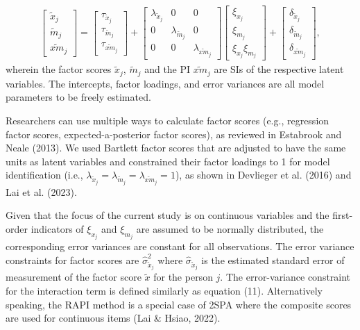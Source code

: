 \documentclass[
  man]{apa6}
\begin{document}
\begin{align}
    \begin{bmatrix}
        \tilde{x}_{j} \\ 
        \tilde{m}_{j} \\
        \widetilde{xm}_{j} 
    \end{bmatrix} = 
    \begin{bmatrix}
        \tau_{\tilde{x}_{j}} \\
        \tau_{\tilde{m}_{j}} \\ 
        \tau_{\widetilde{xm}_{j}}
    \end{bmatrix} + 
    \begin{bmatrix}
        \lambda_{\tilde{x}_{j}} & 0 & 0 \\
        0 & \lambda_{\tilde{m}_{j}} & 0 \\ 
        0 & 0 & \lambda_{\widetilde{xm}_{j}} 
    \end{bmatrix} 
    \begin{bmatrix}
        \xi_{x_{j}} \\  
        \xi_{m_{j}} \\
        \xi_{x_{j}}\xi_{m_{j}}
    \end{bmatrix} +
    \begin{bmatrix}
        \delta_{\tilde{x}_{j}} \\
        \delta_{\tilde{m}_{j}} \\ 
        \delta_{\widetilde{xm}_{j}}
    \end{bmatrix},
\end{align}
wherein the factor scores \(\tilde{x}_{j}\), \(\tilde{m}_{j}\) and the PI \(\widetilde{xm}_{j}\) are SIs of the respective latent variables. The intercepts, factor loadings, and error variances are all model parameters to be freely estimated.

Researchers can use multiple ways to calculate factor scores (e.g., regression factor scores, expected-a-posterior factor scores), as reviewed in Estabrook and Neale (2013). We used Bartlett factor scores that are adjusted to have the same units as latent variables and constrained their factor loadings to 1 for model identification (i.e., \(\lambda_{\tilde{x}_{j}} = \lambda_{\tilde{m}_{j}} = \lambda_{\widetilde{xm}_{j}} = 1\)), as shown in Devlieger et al. (2016) and Lai et al. (2023).

Given that the focus of the current study is on continuous variables and the first-order indicators of \(\xi_{x_{j}}\) and \(\xi_{m_{j}}\) are assumed to be normally distributed, the corresponding error variances are constant for all observations. The error variance constraints for factor scores are \(\hat{\sigma}_{\tilde{x}_{j}}^2\) where \(\hat{\sigma}_{\tilde{x}_{j}}\) is the estimated standard error of measurement of the factor score \(\tilde{x}\) for the person \(j\). The error-variance constraint for the interaction term is defined similarly as equation (11). Alternatively speaking, the RAPI method is a special case of 2SPA where the composite scores are used for continuous items (Lai \& Hsiao, 2022).
\end{document}

